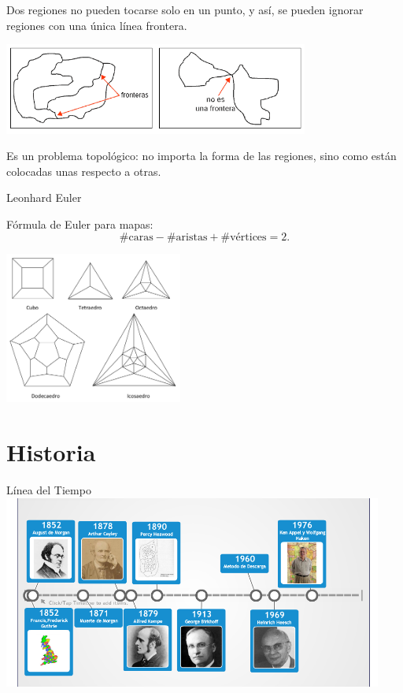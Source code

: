 \documentclass[spanish,utf8]{beamer}
\begin{document}
\begin{frame}{\insertsection}
\begin{block}{}
Dos regiones no pueden tocarse solo en un punto, y así, se pueden ignorar regiones con una única línea frontera.
\end{block}
\begin{center}
\includegraphics[height=3cm]{fronteras.png}
\end{center}

\begin{block}{}
Es un problema topológico: no importa la forma de las regiones, sino como están colocadas unas respecto a otras.
\end{block}
\end{frame}


\begin{frame}{\insertsection}\transblindsvertical
Leonhard Euler
\begin{block}{Fórmula de Euler para mapas:}
$$
\#\text{caras} - \#\text{aristas} + \#\text{vértices} = 2.
$$
\end{block}
\begin{center}
   \includegraphics[height=5cm]{poliedros2.jpg}
\end{center}
\end{frame}
\section{Historia}

\begin{frame}{\insertsection}\transblindsvertical
Línea del Tiempo
\centering
\includegraphics[width=12.5cm]{linea.png}    
\end{frame}
\end{document}
